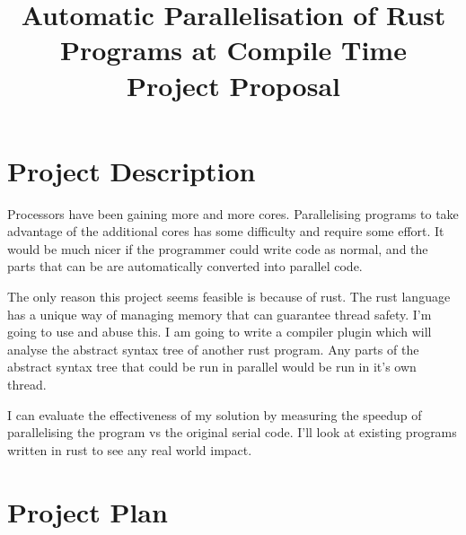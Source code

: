 \documentclass[12pt, a4paper]{article}
\title{
	\vspace{-4ex}
	\LARGE\textbf{Automatic Parallelisation of Rust Programs at Compile Time} \\
	\large\textbf{Project Proposal}
	\vspace{-9ex}
}
\date{}
\begin{document}
\maketitle

\section{Project Description}
Processors have been gaining more and more cores. Parallelising programs to take advantage of the additional cores has some difficulty and require some effort. It would be much nicer if the programmer could write code as normal, and the parts that can be are automatically converted into parallel code.

The only reason this project seems feasible is because of rust.
The rust language has a unique way of managing memory that can guarantee thread safety. I'm going to use and abuse this. I am going to write a compiler plugin which will analyse the abstract syntax tree of another rust program. Any parts of the abstract syntax tree that could be run in parallel would be run in it's own thread.

I can evaluate the effectiveness of my solution by measuring the speedup of parallelising the program vs the original serial code. I'll look at existing programs written in rust to see any real world impact.

\section{Project Plan}
\\
\end{document}
